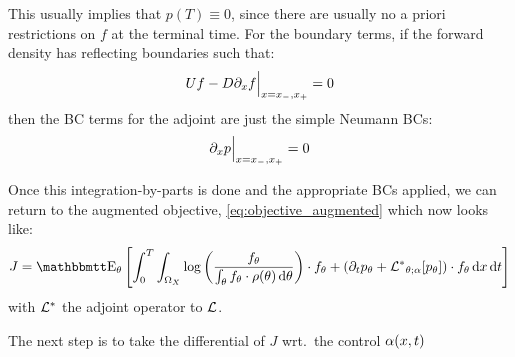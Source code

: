\documentclass{article}
\begin{document}
This usually implies that $p(T) \equiv 0$, since there are usually no a priori
restrictions on $f$ at the terminal time. For the boundary terms, 
if the forward density has reflecting boundaries such that:
$$
U f - D{\partial}_x f\Big|_{x={ x_{-} }, { x_{+} }}  = 0
$$
then the BC terms for the adjoint are just the simple Neumann BCs:
$$
{\partial}_x p \Big|_{x={ x_{-} }, { x_{+} }} = 0
$$

Once this integration-by-parts is done and the appropriate BCs applied, we
can return to the augmented objective, \cref{eq:objective_augmented} which now
looks like:
\begin{equation}
J =  \Exp_\th
\left[ \int_0^T\int_{\O_X} \log\left(\frac{f_\th}
 					{\int_\th f_\th \cdot \rho(\th)\intd{\th}}\right) 
 			 \cdot f_\th 
 			 + 
 			 (\di_t p_\th + \Lstar_{\th;\a}[p_\th] ) \cdot f_\th
\intd{x}
\intd{t} \right]
\label{eq:objective_augmented_adjoined}
\end{equation}
with ${ { \mathcal{L} }^* }$ the adjoint operator to ${ \mathcal{L} }$.

The next step is to take the differential of $J$ wrt.\ the control
${\alpha}(x,t)$

\end{document}
